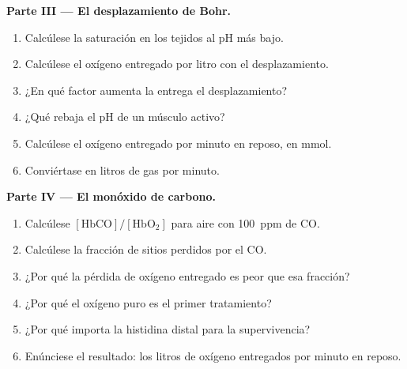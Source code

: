\begin{problem}
\medskip\noindent\textbf{Parte III --- El desplazamiento de Bohr.}
\begin{enumerate}[resume]
  \item Calcúlese la saturación en los tejidos al pH más bajo.
  \item Calcúlese el oxígeno entregado por litro con el desplazamiento.
  \item ¿En qué factor aumenta la entrega el desplazamiento?
  \item ¿Qué rebaja el pH de un músculo activo?
  \item Calcúlese el oxígeno entregado por minuto en reposo, en mmol.
  \item Conviértase en litros de gas por minuto.
\end{enumerate}

\medskip\noindent\textbf{Parte IV --- El monóxido de carbono.}
\begin{enumerate}[resume]
  \item Calcúlese $[\mathrm{HbCO}]/[\mathrm{HbO_2}]$ para aire con \qty{100}{ppm} de CO.
  \item Calcúlese la fracción de sitios perdidos por el CO.
  \item ¿Por qué la pérdida de oxígeno entregado es peor que esa fracción?
  \item ¿Por qué el oxígeno puro es el primer tratamiento?
  \item ¿Por qué importa la histidina distal para la supervivencia?
  \item Enúnciese el resultado: los litros de oxígeno entregados por minuto en reposo.
\end{enumerate}
\end{problem}
